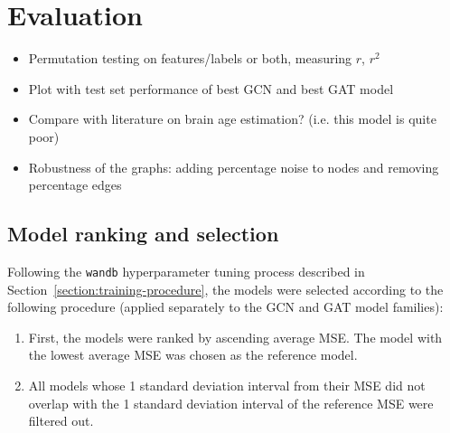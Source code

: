 \chapter{Evaluation}


\begin{itemize}
    \item Permutation testing on features/labels or both, measuring $r$, $r^2$
    \item Plot with test set performance of best GCN and best GAT model
    \item Compare with literature on brain age estimation? (i.e. this model is quite poor)
    \item Robustness of the graphs: adding percentage noise to nodes and removing percentage edges
\end{itemize}

\section{Model ranking and selection}
Following the \texttt{wandb} hyperparameter tuning process described in Section~\ref{section:training-procedure}, the models were selected according to the following procedure (applied separately to the GCN and GAT model families):
\begin{enumerate}
    \item First, the models were ranked by ascending average MSE. The model with the lowest average MSE was chosen as the reference model.
    \item All models whose 1 standard deviation interval from their MSE did not overlap with the 1 standard deviation interval of the reference MSE were filtered out.
\end{enumerate}

